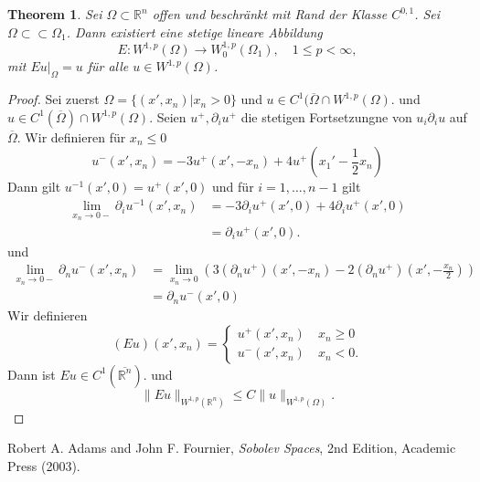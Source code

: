 \documentclass[
paper=a4,
bibtotocnumbered,
liststotocnumbered,
tablecaptionabove,
pointlessnumbers,
twoside,
openright,
10pt
]
{report}
\newtheorem{thm}{Theorem}[chapter]
\theoremstyle{definition}
\numberwithin{equation}{chapter}
\begin{document}
\begin{thm}\label{4.6}
 Sei $\Omega\subset \mathbb R^n$ offen und beschränkt mit Rand der Klasse $C^{0,1}$. Sei $\Omega \subset \subset \Omega_1$. Dann existiert eine stetige lineare Abbildung
 \begin{equation}
 E: W^{1,p}(\Omega) \to W_{0}^{1,p}(\Omega_1), \quad 1\le p <\infty,
 \end{equation}
 mit $Eu\big|_\Omega=u$ für alle $u\in W^{1,p}(\Omega)$.
\end{thm}
\begin{proof}
 Sei zuerst $\Omega=\{(x', x_n) |x_n >0\}$ und $u\in C^1(\overline{\Omega} \cap W^{1,p}(\Omega)$. und $u\in C^1(\overline{\Omega}) \cap W^{1,p}(\Omega)$. Seien $u^+, \partial_i u^+$ die stetigen Fortsetzungne von $u_i \partial_i u$ auf $\overline{\Omega}$. Wir definieren für $x_n \le 0$
 \begin{equation}
  u^{-}(x', x_n) = - 3 u^+(x', -x_n) + 4u^+\left (x_1' - \frac{1}{2} x_n\right )
 \end{equation}
 Dann gilt $u^{-1}(x',0)=u^+(x',0)$ und für
 $i=1, \ldots, n-1$ gilt
 \begin{align*}
  \lim_{x_n\to 0-} \partial_i  u^{-1}(x', x_n) &= - 3\partial_i u^{+}(x',0) + 4\partial_i u^+(x',0) \\
  &=\partial_i u^+ (x',0).
 \end{align*}
und 
\begin{align*}
 \lim_{x_n\to 0-} \partial_n u^{-} (x', x_n) &= \lim_{x_n\to 0} (3(\partial_n u^+) (x', -x_n) - 2(\partial_n u^+) (x', -\frac{x_n}{2}))\\
 &=\partial_n u^{-}(x',0)
\end{align*}
Wir definieren
\begin{equation}
 (Eu)(x', x_n) = \begin{cases}
                  u^{+}(x', x_n) \quad x_n \ge 0 \\
                  u^{-}(x', x_n) \quad x_n <0.
                 \end{cases}
\end{equation}
Dann ist $Eu\in C^1(\overline{\mathbb R^n})$. und 
\begin{equation}
 \| Eu\|_{W^{1,p}(\mathbb R^n)} \le C\|u\|_{W^{1,p}(\Omega)}.
\end{equation}



\end{proof}












\begin{thebibliography}{xxx}
 Robert A. Adams and John F.  Fournier, \textit{Sobolev Spaces}, 2nd Edition, Academic Press (2003).
\end{thebibliography}
\end{document}
